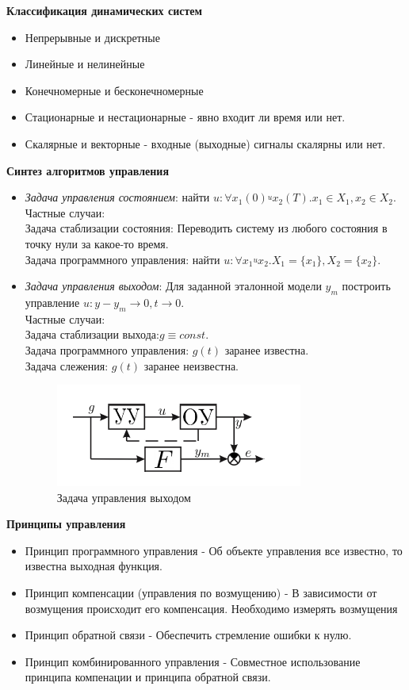 \documentclass[A4]{article}
\begin{document}
\textbf{Классификация динамических систем}
\begin{itemize}
	\item Непрерывные и дискретные
	\item Линейные и нелинейные
	\item Конечномерные и бесконечномерные
	\item Стационарные и нестационарные - явно входит ли время или нет. 
	\item Скалярные и векторные - входные (выходные) сигналы скалярны или нет. 
\end{itemize}

\textbf{Синтез алгоритмов управления}
\begin{itemize}
	\item \emph{Задача управления состоянием}: найти $u: \forall x_1(0)\stackrel{u}{} x_2(T).x_1\in X_1,x_2\in X_2$.\\
	Частные случаи: \\
	Задача стаблизации состояния: Переводить систему из любого состояния в точку нули за какое-то время.\\
	Задача программного управления: найти $u: \forall x_1\stackrel{u}{} x_2.X_1=\{x_1\},X_2=\{x_2\}$.\\
	\item \emph{Задача управления выходом}: Для заданной эталонной модели $y_m$ построить управление $u:y-y_m \rightarrow 0, t\rightarrow 0$.\\
	Частные случаи: \\
	Задача стаблизации выхода:$g\equiv const$.\\
	Задача программного управления: $g(t)$ заранее известна.\\
	Задача слежения: $g(t)$ заранее неизвестна.\\
	\begin{figure}
		\centering
		\includegraphics[width=0.7\linewidth]{5}
		\caption{Задача управления выходом}
		\label{fig:5}
	\end{figure}
\end{itemize}

\textbf{Принципы управления}
\begin{itemize}
	\item Принцип программного управления - Об объекте управления все известно, то известна выходная функция. 
	\item Принцип компенсации (управления по возмущению) - В зависимости от возмущения происходит его компенсация. Необходимо измерять возмущения
	\item Принцип обратной связи - Обеспечить стремление ошибки к нулю.
	\item Принцип комбинированного управления - Совместное использование принципа компенации и принципа обратной связи.
\end{itemize}
\end{document}

